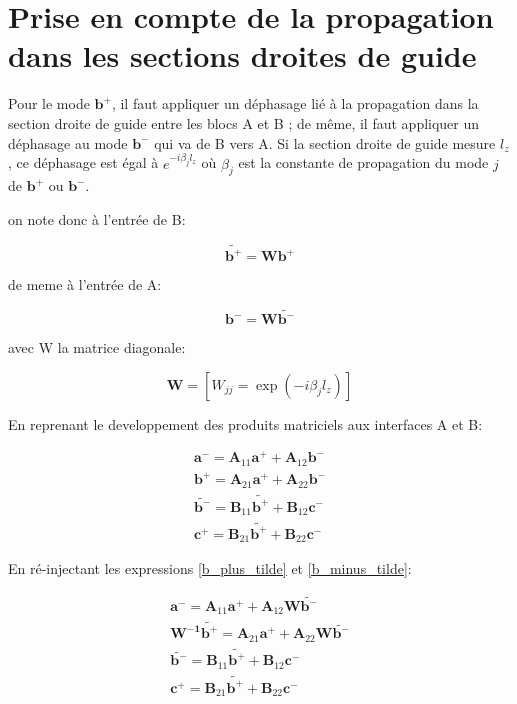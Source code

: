 \documentclass[12pt,a4paper]{report}
\begin{document}
\section{Prise en compte de la propagation dans les sections droites de guide}

Pour le mode $\mathbf{b^+}$, il faut appliquer un déphasage lié à la propagation dans la section droite de guide entre les blocs A et B ; de même, il faut appliquer
un déphasage au mode $\mathbf{b^-}$ qui va de B vers A. Si la section droite de guide mesure $l_z$, ce déphasage est égal à
$e^{-i \beta_j l_z}$ où $\beta_j$ est la constante de propagation du mode $j$ de $\mathbf{b^+}$ ou $\mathbf{b^-}$.

on note donc à l'entrée de B:

\begin{equation}
    \widetilde{\mathbf{b^+}} = \mathbf{W} \mathbf{b^+} \label{b_plus_tilde}
\end{equation}

de meme à l'entrée de A:

\begin{equation}
    \mathbf{b^-} = \mathbf{W} \widetilde{\mathbf{b^-}} \label{b_minus_tilde}
\end{equation}

avec W la matrice diagonale:

\begin{equation}
    \mathbf{W} = \left[ W_{jj} = \exp(-i \beta_j l_z) \right]
\end{equation}

En reprenant le developpement des produits matriciels aux interfaces A et B:

\begin{align}
    \mathbf{a}^- = \mathbf{A}_{11} \mathbf{a}^+ + \mathbf{A}_{12} \mathbf{b}^- \\
    \mathbf{b}^+ = \mathbf{A}_{21} \mathbf{a}^+ + \mathbf{A}_{22} \mathbf{b}^- \\
    \widetilde{\mathbf{b}^-} = \mathbf{B}_{11} \widetilde{\mathbf{b}^+} + \mathbf{B}_{12} \mathbf{c}^- \\
    \mathbf{c}^+ = \mathbf{B}_{21} \widetilde{\mathbf{b}^+} + \mathbf{B}_{22} \mathbf{c}^- 
\end{align}

En ré-injectant les expressions \ref{b_plus_tilde} et \ref{b_minus_tilde}:

\begin{align}
    \mathbf{a}^- = \mathbf{A}_{11} \mathbf{a}^+ + \mathbf{A}_{12} \mathbf{W} \widetilde{\mathbf{b^-}} \\
    \mathbf{W^{-1}} \widetilde{\mathbf{b}^+} = \mathbf{A}_{21} \mathbf{a}^+ + \mathbf{A}_{22} \mathbf{W} \widetilde{\mathbf{b^-}} \\
    \widetilde{\mathbf{b}^-} = \mathbf{B}_{11} \widetilde{\mathbf{b}^+} + \mathbf{B}_{12} \mathbf{c}^- \\
    \mathbf{c}^+ = \mathbf{B}_{21} \widetilde{\mathbf{b}^+} + \mathbf{B}_{22} \mathbf{c}^- 
\end{align}
\end{document}

